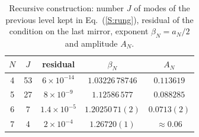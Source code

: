 \begin{table}[h]
\caption{Recursive construction: number $J$ of modes of the previous level kept in Eq.~(\ref{S:rung}), residual of the condition on the last mirror, exponent $\beta_N = a_N/2$ and amplitude $A_N$.}
\label{S:tab-ladder}
\begin{ruledtabular}
\begin{tabular}{ccccc}
$N$ & $J$ & residual & $\beta_N$ & $A_N$\\
\hline
4 & 53 & $6\times10^{-14}$ & $1.03226\,78746$ & $0.113619$\\
5 & 27 & $8\times10^{-9}$ & $1.12586\,577$ & $0.088285$\\
6 & 7 & $1.4\times10^{-5}$ & $1.20250\,71(2)$ & $0.0713(2)$\\
7 & 4 & $2\times10^{-4}$ & $1.26720(1)$ & $\approx0.06$\\
\end{tabular}
\end{ruledtabular}
\end{table}

